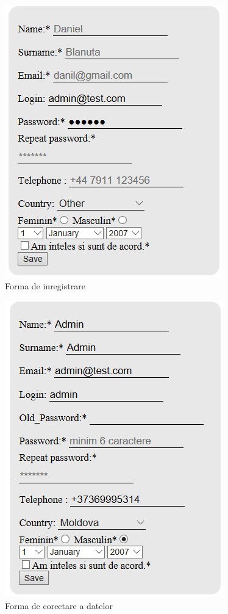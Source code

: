 \begin{figure}[!htbp]
	\begin{center}
		\centering
		\includegraphics[scale = 0.8]{img/user_form}
		\caption{Forma de inregistrare}%
		\label{fig:add_key_onserver}
	\end{center}
\end{figure}
\begin{figure}[!htbp]
	\begin{center}
		\centering
		\includegraphics[scale = 0.8]{img/user_data}
		\caption{Forma de corectare a datelor}%
		\label{fig:add_key_onserver}
	\end{center}
\end{figure}

